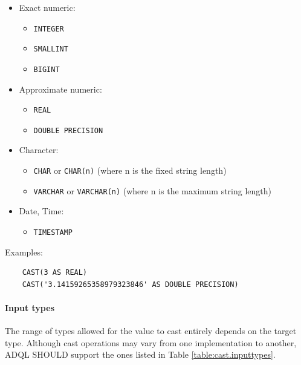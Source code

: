 \documentclass[11pt,a4paper]{ivoa}
\begin{document}
\begin{itemize}
    \item Exact numeric:
    \begin{itemize}
        \item \verb:INTEGER:
        \item \verb:SMALLINT:
        \item \verb:BIGINT:
    \end{itemize}
    \item Approximate numeric:
    \begin{itemize}
        \item \verb:REAL:
        \item \verb:DOUBLE PRECISION:
    \end{itemize}
    \item Character:
    \begin{itemize}
        \item \verb:CHAR: or \verb:CHAR(n): (where n is the fixed string length)
        \item \verb:VARCHAR: or \verb:VARCHAR(n): (where n is the maximum string length)
    \end{itemize}
    \item Date, Time:
    \begin{itemize}
        \item \verb:TIMESTAMP:
    \end{itemize}
\end{itemize}

Examples:

\begin{verbatim}
    CAST(3 AS REAL)
    CAST('3.14159265358979323846' AS DOUBLE PRECISION)
\end{verbatim}

\paragraph{Input types}

The range of types allowed for the value to cast entirely depends on the target
type. Although cast operations may vary from one implementation to another, ADQL
SHOULD support the ones listed in Table \ref{table:cast.inputtypes}.
\end{document}
